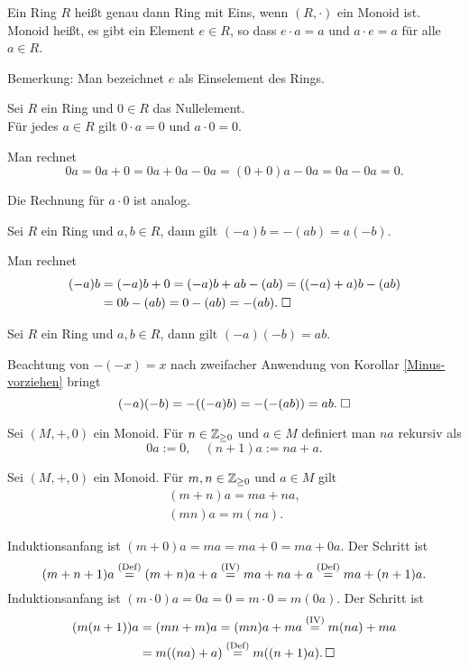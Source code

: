 \begin{Definition}
Ein Ring $R$ heißt genau dann Ring mit Eins, wenn $(R,\cdot)$ ein
Monoid ist. Monoid heißt, es gibt ein Element $e\in R$, so dass
$e\cdot a = a$ und $a\cdot e = a$ für alle $a\in R$.
\end{Definition}
Bemerkung: Man bezeichnet $e$ als Einselement des Rings.

\begin{Korollar}
Sei $R$ ein Ring und $0\in R$ das Nullelement.\\
Für jedes $a\in R$ gilt $0\cdot a = 0$ und $a\cdot 0 = 0$.
\end{Korollar}
\begin{Beweis} Man rechnet
\[0a = 0a+0 = 0a+0a-0a = (0+0)a-0a = 0a-0a = 0.\]
\end{Beweis}
Die Rechnung für $a\cdot 0$ ist analog.\;\qedsymbol

\begin{Korollar}\label{Minus-vorziehen}
Sei $R$ ein Ring und $a,b\in R$, dann gilt $(-a)b = -(ab) = a(-b)$.
\end{Korollar}
\begin{Beweis}
Man rechnet
\begin{align*}
(-a)b &= (-a)b+0 = (-a)b+ab-(ab) = ((-a)+a)b-(ab)\\
&= 0b-(ab) = 0-(ab) = -(ab).\;\square
\end{align*}
\end{Beweis}

\begin{Korollar}\newlinefirst
Sei $R$ ein Ring und $a,b\in R$, dann gilt
$(-a)(-b) = ab$.
\end{Korollar}
Beachtung von $-(-x)=x$ nach zweifacher Anwendung von
Korollar \ref{Minus-vorziehen} bringt
\[(-a)(-b) = -((-a)b) = -(-(ab)) = ab.\;\square\]

\begin{Definition}
Sei $(M,+,0)$ ein Monoid. Für $n\in\mathbb Z_{\ge 0}$ und $a\in M$ definiert
man $na$ rekursiv als
\[0a := 0,\quad (n+1)a := na + a.\]
\end{Definition}

\begin{Korollar}
Sei $(M,+,0)$ ein Monoid. Für $m,n\in\mathbb Z_{\ge 0}$ und $a\in M$ gilt
\begin{gather}
(m+n)a = ma + na,\\
(mn)a = m(na).
\end{gather}
\end{Korollar}
\begin{Beweis}
Induktionsanfang ist $(m+0)a = ma = ma+0 = ma + 0a$. Der Schritt ist%
\[(m+n+1)a \stackrel{\mathrm{(Def)}}{=} (m+n)a + a
\stackrel{\mathrm{(IV)}}{=} ma+na + a
\stackrel{\mathrm{(Def)}}{=} ma + (n+1)a.\]
Induktionsanfang ist $(m\cdot 0)a = 0a = 0 = m\cdot 0 = m(0a)$.
Der Schritt ist
\begin{align*}
(m(n+1))a &= (mn+m)a = (mn)a+ma \stackrel{\mathrm{(IV)}}{=} m(na)+ma\\
&= m((na)+a) \stackrel{\mathrm{(Def)}}{=}
m((n+1)a).\,\square
\end{align*}
\end{Beweis}

